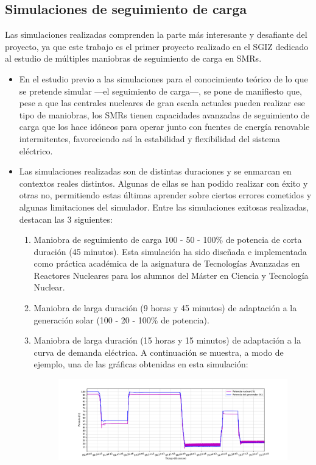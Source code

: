 \documentclass[a4paper, 11pt, spanish, twoside]{article}
\begin{document}
\subsection*{Simulaciones de seguimiento de carga}

Las simulaciones realizadas comprenden la parte más interesante y desafiante del proyecto, ya que este trabajo es el primer proyecto realizado en el SGIZ dedicado al estudio de múltiples maniobras de seguimiento de carga en SMRs.

\begin{itemize}
    \item En el estudio previo a las simulaciones para el conocimiento teórico de lo que se pretende simular ---el seguimiento de carga---, se pone de manifiesto que, pese a que las centrales nucleares de gran escala actuales pueden realizar ese tipo de maniobras, los SMRs tienen capacidades avanzadas de seguimiento de carga que los hace idóneos para operar junto con fuentes de energía renovable intermitentes, favoreciendo así la estabilidad y flexibilidad del sistema eléctrico.
    \item Las simulaciones realizadas son de distintas duraciones y se enmarcan en contextos reales distintos. Algunas de ellas se han podido realizar con éxito y otras no, permitiendo estas últimas aprender sobre ciertos errores cometidos y algunas limitaciones del simulador. Entre las simulaciones exitosas realizadas, destacan las 3 siguientes:
    \begin{enumerate}
        \item Maniobra de seguimiento de carga 100 - 50 - 100\% de potencia de corta duración (45 minutos). Esta simulación ha sido diseñada e implementada como práctica académica de la asignatura de Tecnologías Avanzadas en Reactores Nucleares para los alumnos del Máster en Ciencia y Tecnología Nuclear.
        \item Maniobra de larga duración (9 horas y 45 minutos) de adaptación a la generación solar (100 - 20 - 100\% de potencia).
        \item Maniobra de larga duración (15 horas y 15 minutos) de adaptación a la curva de demanda eléctrica. A continuación se muestra, a modo de ejemplo, una de las gráficas obtenidas en esta simulación:
        \begin{figure}[h!]
            \centering
            \includegraphics[width=\textwidth]{content/figures/sim4_potencias.pdf}

\end{figure}
\end{enumerate}
\end{itemize}
\end{document}
